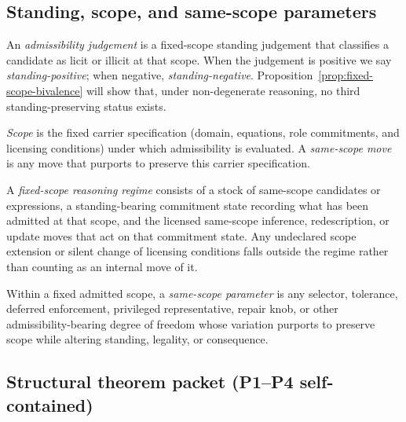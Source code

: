 \subsection{Standing, scope, and same-scope parameters}

\begin{definition}\label{def:standing}
An \emph{admissibility judgement} is a fixed-scope standing judgement that classifies a candidate as licit or illicit at that scope. When the judgement is positive we say \emph{standing-positive}; when negative, \emph{standing-negative}. Proposition~\ref{prop:fixed-scope-bivalence} will show that, under non-degenerate reasoning, no third standing-preserving status exists.
\end{definition}

\begin{definition}\label{def:scope}
\emph{Scope} is the fixed carrier specification (domain, equations, role commitments,
and licensing conditions) under which admissibility is evaluated.
A \emph{same-scope move} is any move that purports to preserve this carrier specification.
\end{definition}

\begin{definition}\label{def:fixed-scope-reasoning-regime}
A \emph{fixed-scope reasoning regime} consists of a stock of same-scope candidates or expressions, a standing-bearing commitment state recording what has been admitted at that scope, and the licensed same-scope inference, redescription, or update moves that act on that commitment state. Any undeclared scope extension or silent change of licensing conditions falls outside the regime rather than counting as an internal move of it.
\end{definition}

\begin{definition}\label{def:same-scope-parameter}
Within a fixed admitted scope, a \emph{same-scope parameter} is any selector, tolerance,
deferred enforcement, privileged representative, repair knob, or other admissibility-bearing
degree of freedom whose variation purports to preserve scope while altering standing,
legality, or consequence.
\end{definition}

\subsection{Structural theorem packet (P1--P4 self-contained)}

